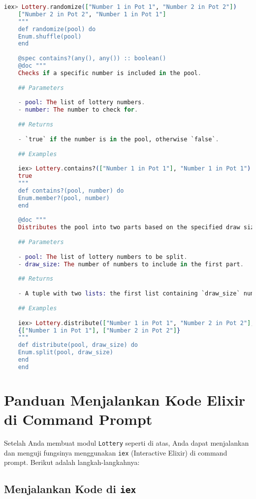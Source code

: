 \begin{lstlisting}[language=elixir, caption={Complete Lottery Module}]
	iex> Lottery.randomize(["Number 1 in Pot 1", "Number 2 in Pot 2"])
	["Number 2 in Pot 2", "Number 1 in Pot 1"]
	"""
	def randomize(pool) do
	Enum.shuffle(pool)
	end
	
	@spec contains?(any(), any()) :: boolean()
	@doc """
	Checks if a specific number is included in the pool.
	
	## Parameters
	
	- pool: The list of lottery numbers.
	- number: The number to check for.
	
	## Returns
	
	- `true` if the number is in the pool, otherwise `false`.
	
	## Examples
	
	iex> Lottery.contains?(["Number 1 in Pot 1"], "Number 1 in Pot 1")
	true
	"""
	def contains?(pool, number) do
	Enum.member?(pool, number)
	end
	
	@doc """
	Distributes the pool into two parts based on the specified draw size.
	
	## Parameters
	
	- pool: The list of lottery numbers to be split.
	- draw_size: The number of numbers to include in the first part.
	
	## Returns
	
	- A tuple with two lists: the first list containing `draw_size` numbers, and the second list containing the remaining numbers.
	
	## Examples
	
	iex> Lottery.distribute(["Number 1 in Pot 1", "Number 2 in Pot 2"], 1)
	{["Number 1 in Pot 1"], ["Number 2 in Pot 2"]}
	"""
	def distribute(pool, draw_size) do
	Enum.split(pool, draw_size)
	end
	end
\end{lstlisting}

\section{Panduan Menjalankan Kode Elixir di Command Prompt}

Setelah Anda membuat modul \texttt{Lottery} seperti di atas, Anda dapat menjalankan dan menguji fungsinya menggunakan \texttt{iex} (Interactive Elixir) di command prompt. Berikut adalah langkah-langkahnya:

\subsection{Menjalankan Kode di \texttt{iex}}

